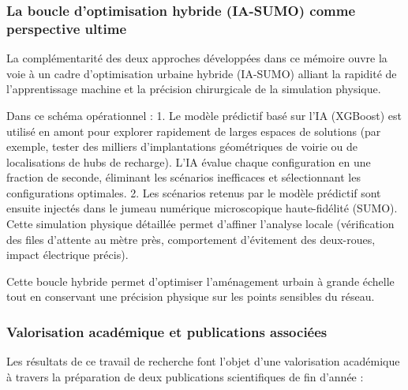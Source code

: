 \documentclass[10pt, a4paper]{article}
\begin{document}
\subsubsection{La boucle d'optimisation hybride (IA-SUMO) comme
perspective
ultime}\label{la-boucle-doptimisation-hybride-ia-sumo-comme-perspective-ultime}

La complémentarité des deux approches développées dans ce mémoire ouvre
la voie à un cadre d'optimisation urbaine hybride (IA-SUMO) alliant la
rapidité de l'apprentissage machine et la précision chirurgicale de la
simulation physique.

Dans ce schéma opérationnel : 1. Le modèle prédictif basé sur l'IA
(XGBoost) est utilisé en amont pour explorer rapidement de larges
espaces de solutions (par exemple, tester des milliers d'implantations
géométriques de voirie ou de localisations de hubs de recharge). L'IA
évalue chaque configuration en une fraction de seconde, éliminant les
scénarios inefficaces et sélectionnant les configurations optimales. 2.
Les scénarios retenus par le modèle prédictif sont ensuite injectés dans
le jumeau numérique microscopique haute-fidélité (SUMO). Cette
simulation physique détaillée permet d'affiner l'analyse locale
(vérification des files d'attente au mètre près, comportement
d'évitement des deux-roues, impact électrique précis).

Cette boucle hybride permet d'optimiser l'aménagement urbain à grande
échelle tout en conservant une précision physique sur les points
sensibles du réseau.

\subsubsection{Valorisation académique et publications
associées}\label{valorisation-acaduxe9mique-et-publications-associuxe9es}

Les résultats de ce travail de recherche font l'objet d'une valorisation
académique à travers la préparation de deux publications scientifiques
de fin d'année :
\end{document}
